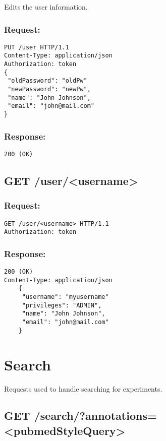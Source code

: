 Edits the user information.

\subsubsection*{Request:}
\begin{verbatim}
PUT /user HTTP/1.1
Content-Type: application/json
Authorization: token
{
 "oldPassword": "oldPw"
 "newPassword": "newPw",
 "name": "John Johnson",
 "email": "john@mail.com"
}
\end{verbatim}


\subsubsection*{Response:}
\begin{verbatim}
200 (OK)
\end{verbatim}

\subsection*{GET /user/<username>}

\subsubsection*{Request:}
\begin{verbatim}
GET /user/<username> HTTP/1.1
Authorization: token
\end{verbatim}

\subsubsection*{Response:}
\begin{verbatim}
200 (OK)
Content-Type: application/json
    {
     "username": "myusername"
     "privileges": "ADMIN",
     "name": "John Johnson",
     "email": "john@mail.com"
    }
\end{verbatim}

\section*{Search}

Requests used to handle searching for experiments.

\subsection*{GET /search/?annotations=<pubmedStyleQuery>}

